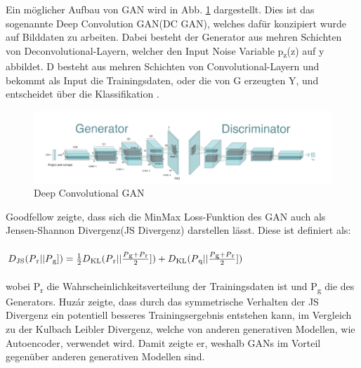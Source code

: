 \documentclass{llncs}
\begin{document}
\\\\
Ein möglicher Aufbau von GAN wird in Abb. \ref{fig:Bild21} dargestellt. Dies ist das sogenannte Deep Convolution GAN(DC GAN), welches dafür konzipiert wurde auf Bilddaten zu arbeiten. Dabei besteht der Generator aus mehren Schichten von Deconvolutional-Layern, welcher den Input Noise Variable p\textsubscript{z}(z) auf y abbildet. D besteht aus mehren Schichten von Convolutional-Layern und bekommt als Input die Trainingsdaten, oder die von G erzeugten Y, und entscheidet über die Klassifikation \cite{dcgan}.
\begin{figure}[htbp] 
	\centering
	\includegraphics[width=1.0\textwidth]{dcgan1.png}
	\caption{Deep Convolutional GAN\protect\cite{dc-gan_book}}
	\label{fig:Bild21}
\end{figure}
Goodfellow \cite{goodfellow2014} zeigte, dass sich die MinMax Loss-Funktion des GAN auch als Jensen-Shannon Divergenz(JS Divergenz) darstellen lässt. Diese ist definiert als:
\\\\
\begin{math} D\textsubscript{JS}(P\textsubscript{r}|| P\textsubscript{g}])=\frac{1}{2}D\textsubscript{KL}(P\textsubscript{r}|| \frac{P\textsubscript{g}+P\textsubscript{r}}{2}])+D\textsubscript{KL}(P\textsubscript{q}|| \frac{P\textsubscript{g}+P\textsubscript{r}}{2}])  
\end{math}
\\\\
wobei P\textsubscript{r} die Wahrscheinlichkeitsverteilung der Trainingsdaten ist und P\textsubscript{g} die des Generators. Huzár \cite{sha} zeigte, dass durch das symmetrische Verhalten der JS Divergenz ein potentiell besseres Trainingsergebnis entstehen kann, im Vergleich zu der Kulbach Leibler Divergenz, welche von anderen generativen Modellen, wie Autoencoder, verwendet wird. Damit zeigte er, weshalb GANs im Vorteil gegenüber anderen generativen Modellen sind.
\end{document}
